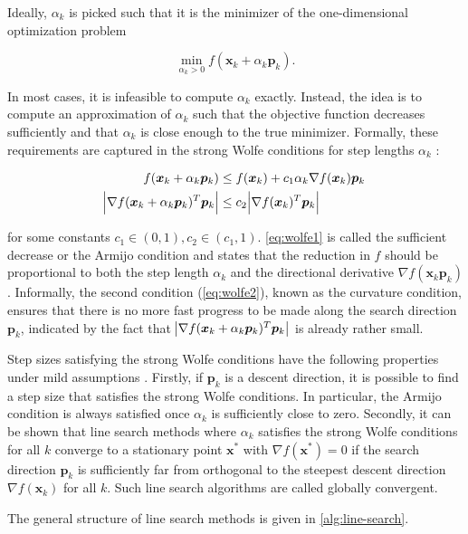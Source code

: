 Ideally, $\alpha_k$ is picked such that it is the minimizer of the one-dimensional optimization problem

\[
    \min_{\alpha_k > 0} f(\bm{x}_k + \alpha_k \bm{p}_k).
\]

\noindent In most cases, it is infeasible to compute $\alpha_k$ exactly. Instead, the idea is to compute an approximation of $\alpha_k$ such that 
the objective function decreases sufficiently and that $\alpha_k$ is close enough to the true minimizer. Formally, these requirements
are captured in the strong Wolfe conditions for step lengths $\alpha_k$ \cite{nocedal2006}:

\begin{align}
    f(\bm{x}_k + \alpha_k \bm{p}_k) &\leq f(\bm{x}_k) + c_1 \alpha_k \nabla f(\bm{x}_k) \bm{p}_k \label{eq:wolfe1} \\
    \abs{\nabla f(\bm{x}_k + \alpha_k \bm{p}_k)^T \bm{p}_k} &\leq c_2 \abs{\nabla f(\bm{x}_k)^T \bm{p}_k} \label{eq:wolfe2}
\end{align}

\noindent for some constants $c_1 \in (0, 1), c_2 \in (c_1, 1)$. \cref{eq:wolfe1} is called the sufficient decrease or the Armijo condition 
and states that the reduction in $f$ should be proportional to both the step length $\alpha_k$ and the directional derivative 
$\nabla f(\bm{x}_k \bm{p}_k)$. Informally, the second condition (\cref{eq:wolfe2}), known as the curvature condition, ensures that there 
is no more fast 
progress to be made along the search direction $\bm{p}_k$, indicated by the fact that $\abs{\nabla f(\bm{x}_k + \alpha_k \bm{p}_k)^T 
\bm{p}_k}$ is already rather small. 

Step sizes satisfying the strong Wolfe conditions have the following properties under mild assumptions \cite{nocedal2006}. Firstly, 
if $\bm{p}_k$ is a descent direction, it is possible to find a step size that satisfies the strong Wolfe conditions. In particular,
the Armijo condition is always satisfied once $\alpha_k$ is sufficiently close to zero. Secondly, it 
can be shown that line search methods where $\alpha_k$ satisfies the strong Wolfe conditions for all $k$ converge to a stationary
point $\bm{x}^*$ with $\nabla f(\bm{x}^*) = 0$ if the search direction $\bm{p}_k$ is sufficiently far from orthogonal to the steepest
descent direction $\nabla f(\bm{x}_k)$ for all $k$. Such line search algorithms are called globally convergent.

The general structure of line search methods is given in \cref{alg:line-search}.

